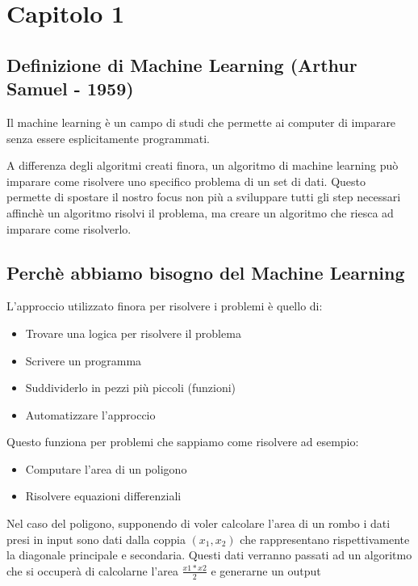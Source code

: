\chapter{Capitolo 1}

\section{Definizione di Machine Learning (Arthur Samuel - 1959)}

Il machine learning è un campo di studi che permette ai computer di imparare senza essere esplicitamente programmati.

A differenza degli algoritmi creati finora, un algoritmo di machine learning può imparare come risolvere uno specifico problema di un set di dati. Questo permette di spostare il nostro focus non più a sviluppare tutti gli step necessari affinchè un algoritmo risolvi il problema, ma creare un algoritmo che riesca ad imparare come risolverlo.

\section{Perchè abbiamo bisogno del Machine Learning}

L'approccio utilizzato finora per risolvere i problemi è quello di:

\begin{itemize}
\item Trovare una logica per risolvere il problema
\item Scrivere un programma
\item Suddividerlo in pezzi più piccoli (funzioni)
\item Automatizzare l'approccio
\end{itemize}

Questo funziona per problemi che sappiamo come risolvere ad esempio:

\begin{itemize}
    \item Computare l'area di un poligono
    \item Risolvere equazioni differenziali
\end{itemize}

\noindent
Nel caso del poligono, supponendo di voler calcolare l'area di un rombo i dati presi in input sono dati dalla coppia $(x_1,x_2)$ che rappresentano rispettivamente la diagonale principale e secondaria.
Questi dati verranno passati ad un algoritmo che si occuperà di calcolarne l'area $\frac{x1*x2}{2}$ e generarne un output

